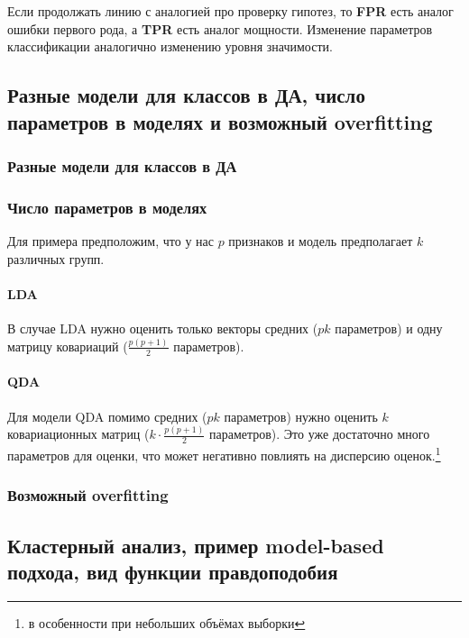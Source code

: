 \documentclass[12pt,a4paper,final]{article}
\newcommand{\1}{\mathds{1}}
\begin{document}
Если продолжать линию с аналогией про проверку гипотез, то \textbf{FPR} есть аналог ошибки первого рода, а \textbf{TPR} есть аналог мощности. Изменение параметров классификации аналогично изменению уровня значимости. 

\subsection{Разные модели для классов в ДА, число параметров в моделях и возможный overfitting}

\subsubsection*{Разные модели для классов в ДА}

\subsubsection*{Число параметров в моделях}

Для примера предположим, что у нас $p$ признаков и модель предполагает $k$ различных групп.

\paragraph{LDA} В случае LDA нужно оценить только векторы средних ($pk$ параметров) и одну матрицу ковариаций ($\frac{p(p+1)}{2}$ параметров).
\paragraph{QDA} Для модели QDA помимо средних ($pk$ параметров) нужно оценить $k$ ковариационных матриц ($k\cdot \frac{p(p+1)}{2} $ параметров). Это уже достаточно много параметров для оценки, что может негативно повлиять на дисперсию оценок.\footnote{в особенности при небольших объёмах выборки}

\subsubsection*{Возможный overfitting}

\subsection{Кластерный анализ, пример model-based подхода, вид функции правдоподобия}
\end{document}
